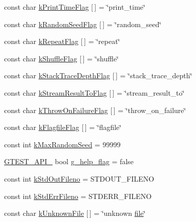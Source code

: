 \begin{DoxyCompactItemize}
\item 
const char \hyperlink{namespacetesting_1_1internal_aa6c13109bb4c78740ddb082b1ec0de56}{k\+Print\+Time\+Flag} \mbox{[}$\,$\mbox{]} = \char`\"{}print\+\_\+time\char`\"{}
\item 
const char \hyperlink{namespacetesting_1_1internal_a964ad71443cfda304b3208bf5d2daa75}{k\+Random\+Seed\+Flag} \mbox{[}$\,$\mbox{]} = \char`\"{}random\+\_\+seed\char`\"{}
\item 
const char \hyperlink{namespacetesting_1_1internal_a764ee423d39ebb8e10c53ab9b685cd9b}{k\+Repeat\+Flag} \mbox{[}$\,$\mbox{]} = \char`\"{}repeat\char`\"{}
\item 
const char \hyperlink{namespacetesting_1_1internal_affd2c1118505cb97d8ff728c95fc722b}{k\+Shuffle\+Flag} \mbox{[}$\,$\mbox{]} = \char`\"{}shuffle\char`\"{}
\item 
const char \hyperlink{namespacetesting_1_1internal_ad6f90e66d431ca3a9084408878c2cc77}{k\+Stack\+Trace\+Depth\+Flag} \mbox{[}$\,$\mbox{]} = \char`\"{}stack\+\_\+trace\+\_\+depth\char`\"{}
\item 
const char \hyperlink{namespacetesting_1_1internal_a84f8a2102d45c8b2b35be06d14ffefb8}{k\+Stream\+Result\+To\+Flag} \mbox{[}$\,$\mbox{]} = \char`\"{}stream\+\_\+result\+\_\+to\char`\"{}
\item 
const char \hyperlink{namespacetesting_1_1internal_ad9efcf363de3483afd91c7393a4fefb8}{k\+Throw\+On\+Failure\+Flag} \mbox{[}$\,$\mbox{]} = \char`\"{}throw\+\_\+on\+\_\+failure\char`\"{}
\item 
const char \hyperlink{namespacetesting_1_1internal_aa1ffe15dea227d4dded912e43a8eed84}{k\+Flagfile\+Flag} \mbox{[}$\,$\mbox{]} = \char`\"{}flagfile\char`\"{}
\item 
const int \hyperlink{namespacetesting_1_1internal_a41bd421ace53d23dbe85d9618c3afaee}{k\+Max\+Random\+Seed} = 99999
\item 
\hyperlink{gtest-port_8h_aa73be6f0ba4a7456180a94904ce17790}{G\+T\+E\+S\+T\+\_\+\+A\+P\+I\+\_\+} bool \hyperlink{namespacetesting_1_1internal_a93a772f5e51973b105d91cbb66a203f4}{g\+\_\+help\+\_\+flag} = false
\item 
const int \hyperlink{namespacetesting_1_1internal_a24f0a3d50cac54a9132f4828ec9b96d9}{k\+Std\+Out\+Fileno} = S\+T\+D\+O\+U\+T\+\_\+\+F\+I\+L\+E\+NO
\item 
const int \hyperlink{namespacetesting_1_1internal_a747eccfdbdee3ff8af3bedc476a57c85}{k\+Std\+Err\+Fileno} = S\+T\+D\+E\+R\+R\+\_\+\+F\+I\+L\+E\+NO
\item 
const char \hyperlink{namespacetesting_1_1internal_abae7a5775c901f2fd12b058b00d09840}{k\+Unknown\+File} \mbox{[}$\,$\mbox{]} = \char`\"{}unknown \hyperlink{_07copy_08_2_read_camera_model_8m_a151631b2fd2bb776ef06c9f440a7ed74}{file}\char`\"{}

\end{DoxyCompactItemize}
